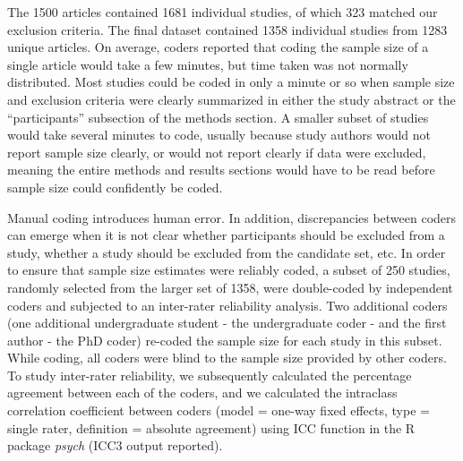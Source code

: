 \documentclass[
  man,floatsintext]{apa6}
\begin{document}
The 1500 articles contained 1681 individual studies, of which 323 matched our exclusion criteria. The final dataset contained 1358 individual studies from 1283 unique articles. On average, coders reported that coding the sample size of a single article would take a few minutes, but time taken was not normally distributed. Most studies could be coded in only a minute or so when sample size and exclusion criteria were clearly summarized in either the study abstract or the ``participants'' subsection of the methods section. A smaller subset of studies would take several minutes to code, usually because study authors would not report sample size clearly, or would not report clearly if data were excluded, meaning the entire methods and results sections would have to be read before sample size could confidently be coded.

Manual coding introduces human error. In addition, discrepancies between coders can emerge when it is not clear whether participants should be excluded from a study, whether a study should be excluded from the candidate set, etc. In order to ensure that sample size estimates were reliably coded, a subset of 250 studies, randomly selected from the larger set of 1358, were double-coded by independent coders and subjected to an inter-rater reliability analysis. Two additional coders (one additional undergraduate student - the undergraduate coder - and the first author - the PhD coder) re-coded the sample size for each study in this subset. While coding, all coders were blind to the sample size provided by other coders. To study inter-rater reliability, we subsequently calculated the percentage agreement between each of the coders, and we calculated the intraclass correlation coefficient between coders (model = one-way fixed effects, type = single rater, definition = absolute agreement) using ICC function in the R package \emph{psych} (ICC3 output reported).
\end{document}
